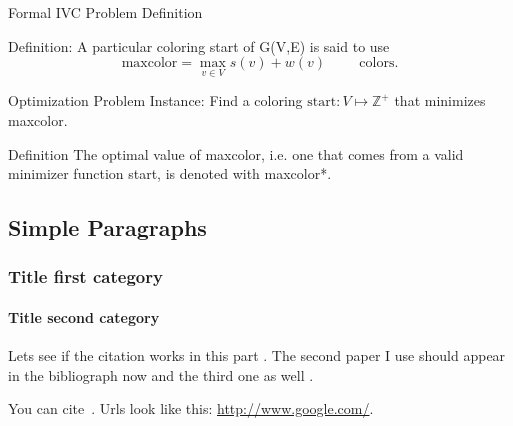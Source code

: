 \begin{frame}{Formal IVC Problem Definition}
  \begin{block}{Definition:}
    A particular coloring start of G(V,E) is said to use 
    \[ \text{maxcolor}= \max_{v \in V} s(v) + w(v) \hspace{1cm}  \text{colors.}\] 
  \end{block}

  \begin{block}{Optimization Problem Instance:}
    Find a coloring $\text{start}:V \mapsto \mathbb{Z}^+$ that minimizes maxcolor.
  \end{block}

  \begin{block}{Definition}
    The optimal value of maxcolor, i.e. one that comes from a valid minimizer function start,
    is denoted with maxcolor*.
    
  \end{block}
  
\end{frame}

      



  \subsection[Paragraphs]{Simple Paragraphs}
  \begin{frame}[fragile]
    \frametitle{Title first category}
    \framesubtitle{Title second category}
  
    Lets see if the citation works in this part \cite{main_paper}. The second paper I use
    should appear in the bibliograph now \cite{kernel_estimation_1} and the third one as well
    \cite{kernel_estimation_2}.
  
    You can cite~\cite{Tan11}. Urls look like this: \url{http://www.google.com/}.
  \end{frame}